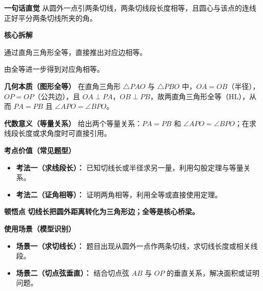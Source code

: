 \begin{explanationbox}
	\textbf{\textcolor{CExplanation}{一句话直觉}}
	从圆外一点引两条切线，两条切线段长度相等，且圆心与该点的连线正好平分两条切线所夹的角。

	\medskip
	\textbf{\textcolor{CExplanation}{核心拆解}}
	\begin{description}[style=nextline, leftmargin=2.8em, labelsep=0.5em, itemsep=0.45em]
		\item[\textbf{要点一（切线长相等）：}]
			通过直角三角形全等，直接推出对应边相等。
		\item[\textbf{要点二（角平分关系）：}]
			由全等进一步得到对应角相等。
	\end{description}

	\medskip
	\textbf{\textcolor{CExplanation}{几何本质（图形全等）}}
	在直角三角形 $\triangle PAO$ 与 $\triangle PBO$ 中，$OA=OB$（半径），$OP=OP$（公共边），且 $OA\perp PA$，$OB\perp PB$，故两直角三角形全等（HL），从而 $PA=PB$ 且 $\angle APO=\angle BPO$。

	\medskip
	\textbf{\textcolor{CExplanation}{代数意义（等量关系）}}
	给出两个等量关系：$PA=PB$ 和 $\angle APO=\angle BPO$；在求线段长度或求角度时可直接引用。

	\medskip
	\textbf{\textcolor{CExplanation}{考点价值（常见题型）}}
	\begin{itemize}[leftmargin=*, itemsep=0.5em, topsep=0.4em]
		\item \textbf{考法一（求线段长）：} 已知切线长或半径求另一量，利用勾股定理与等量关系。
		\item \textbf{考法二（证角相等）：} 证明两角相等，利用全等或直接使用定理。
	\end{itemize}

	\medskip
	\textbf{\textcolor{CExplanation}{顿悟点}}
	\textbf{切线长把圆外距离转化为三角形边；全等是核心桥梁。}

	\medskip
	\textbf{\textcolor{CExplanation}{使用场景（模型识别）}}
	\begin{itemize}[leftmargin=*, itemsep=0.5em, topsep=0.4em]
		\item \textbf{场景一（求切线长）：} 题目出现从圆外一点作两条切线，求切线长度或相关线段。
		\item \textbf{场景二（切点弦垂直）：} 结合切点弦 $AB$ 与 $OP$ 的垂直关系，解决面积或证明问题。
	\end{itemize}

\end{explanationbox}
